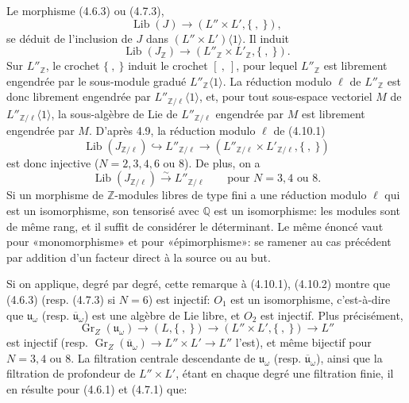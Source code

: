 \documentclass[10pt,a4paper]{article}
\newcommand{\Q}{\mathbb Q}
\newcommand{\Z}{\mathbb Z}
\newcommand{\Gr}{\operatorname{Gr}}
\newcommand{\uomega}{\mathfrak u_\omega}
\theoremstyle{deligne}
\newcommand{\heading}[1]{\vspace{0.65em}\noindent{\bfseries #1}\quad}
\begin{document}
\heading{4.10.} Le morphisme (4.6.3) ou (4.7.3),
\[
\operatorname{Lib}(J)\longrightarrow(L''\times L',\{\ ,\ \}),
\]
se déduit de l'inclusion de \(J\) dans \((L''\times L')\langle1\rangle\). Il induit
\[
\tag{4.10.1}
\operatorname{Lib}(J_{\Z})\longrightarrow(L''_{\Z}\times L'_{\Z},\{\ ,\ \}).
\]
Sur \(L''_{\Z}\), le crochet \(\{\ ,\ \}\) induit le crochet \([\ ,\ ]\), pour lequel \(L''_{\Z}\) est librement engendrée par le sous-module gradué \(L''_{\Z}\langle1\rangle\). La réduction modulo \(\ell\) de \(L''_{\Z}\) est donc librement engendrée par \(L''_{\Z/\ell}\langle1\rangle\), et, pour tout sous-espace vectoriel \(M\) de \(L''_{\Z/\ell}\langle1\rangle\), la sous-algèbre de Lie de \(L''_{\Z/\ell}\) engendrée par \(M\) est librement engendrée par \(M\). D'après 4.9, la réduction modulo \(\ell\) de (4.10.1)
\[
\tag{4.10.2}
\operatorname{Lib}(J_{\Z/\ell})\hookrightarrow L''_{\Z/\ell}
\longrightarrow(L''_{\Z/\ell}\times L'_{\Z/\ell},\{\ ,\ \})
\]
est donc injective (\(N=2,3,4,6\) ou \(8\)). De plus, on a
\[
\tag{4.10.3}
\operatorname{Lib}(J_{\Z/\ell})\overset{\sim}{\longrightarrow}L''_{\Z/\ell}
\qquad\text{pour }N=3,4\text{ ou }8.
\]
Si un morphisme de \(\Z\)-modules libres de type fini a une réduction modulo \(\ell\) qui est un isomorphisme, son tensorisé avec \(\Q\) est un isomorphisme: les modules sont de même rang, et il suffit de considérer le déterminant. Le même énoncé vaut pour «monomorphisme» et pour «épimorphisme»: se ramener au cas précédent par addition d'un facteur direct à la source ou au but.

Si on applique, degré par degré, cette remarque à (4.10.1), (4.10.2) montre que (4.6.3) (resp. (4.7.3) si \(N=6\)) est injectif: \(O_1\) est un isomorphisme, c'est-à-dire que \(\uomega\) (resp. \(\overline{\mathfrak u}_\omega\)) est une algèbre de Lie libre, et \(O_2\) est injectif. Plus précisément,
\[
\tag{4.10.4}
\Gr_Z(\uomega)\longrightarrow(L,\{\ ,\ \})\longrightarrow(L''\times L',\{\ ,\ \})\longrightarrow L''
\]
est injectif (resp. \(\Gr_Z(\overline{\mathfrak u}_\omega)\to L''\times L'\to L''\) l'est), et même bijectif pour \(N=3,4\) ou \(8\). La filtration centrale descendante de \(\uomega\) (resp. \(\overline{\mathfrak u}_\omega\)), ainsi que la filtration de profondeur de \(L''\times L'\), étant en chaque degré une filtration finie, il en résulte pour (4.6.1) et (4.7.1) que:
\end{document}
